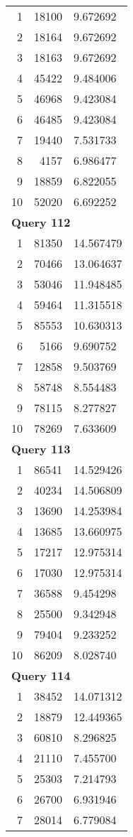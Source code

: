 \begin{longtable}[{p}]{@{}rrp{}@{}}
1 & 18100 & 9.672692 \\
2 & 18164 & 9.672692 \\
3 & 18163 & 9.672692 \\
4 & 45422 & 9.484006 \\
5 & 46968 & 9.423084 \\
6 & 46485 & 9.423084 \\
7 & 19440 & 7.531733 \\
8 & 4157 & 6.986477 \\
9 & 18859 & 6.822055 \\
10 & 52020 & 6.692252 \\
\midrule
\multicolumn{3}{l}{\bfseries Query 112} \\
1 & 81350 & 14.567479 \\
2 & 70466 & 13.064637 \\
3 & 53046 & 11.948485 \\
4 & 59464 & 11.315518 \\
5 & 85553 & 10.630313 \\
6 & 5166 & 9.690752 \\
7 & 12858 & 9.503769 \\
8 & 58748 & 8.554483 \\
9 & 78115 & 8.277827 \\
10 & 78269 & 7.633609 \\
\midrule
\multicolumn{3}{l}{\bfseries Query 113} \\
1 & 86541 & 14.529426 \\
2 & 40234 & 14.506809 \\
3 & 13690 & 14.253984 \\
4 & 13685 & 13.660975 \\
5 & 17217 & 12.975314 \\
6 & 17030 & 12.975314 \\
7 & 36588 & 9.454298 \\
8 & 25500 & 9.342948 \\
9 & 79404 & 9.233252 \\
10 & 86209 & 8.028740 \\
\midrule
\multicolumn{3}{l}{\bfseries Query 114} \\
1 & 38452 & 14.071312 \\
2 & 18879 & 12.449365 \\
3 & 60810 & 8.296825 \\
4 & 21110 & 7.455700 \\
5 & 25303 & 7.214793 \\
6 & 26700 & 6.931946 \\
7 & 28014 & 6.779084 \\

\end{longtable}
